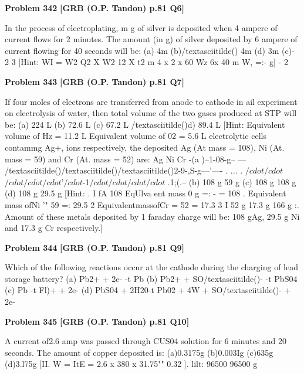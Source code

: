 \begin{problembox}
\textbf{Problem 342} \hfill \textbf{[GRB (O.P. Tandon) p.81 Q6]}
\label{q:ext-grb_all_questions-342}

In the process of electroplating, m g of silver is deposited when 
4 ampere of current flows for 2 minutes. The amount (in g) of 
silver deposited by 6 ampere of current flowing for 40 seconds 
will be: 
(a) 4m 
(b)/textasciitilde() 
4m 
(d) 3m 
(c)-
2 
3 
[Hint: 
WI = 
W2 
Q2 
X 
W2 
12 X t2 
m 
4 x 2 x 60 
Wz 
6x 40 
m 
W, =:- g] 
-
2
\end{problembox}

\begin{problembox}
\textbf{Problem 343} \hfill \textbf{[GRB (O.P. Tandon) p.81 Q7]}
\label{q:ext-grb_all_questions-343}

If four moles of electrons are transferred from anode to 
cathode in ail experiment on electrolysis of water, then total 
volume of the two gases produced at STP will be: 
(a) 224 L 
(b) 72.6 L 
(c) 67.2 L 
/textasciitilde()d) 89.4 L 
[Hint: 
Equivalent volume of Hz = 11.2 L 
Equivalent volume of 02 = 5.6 L 
electrolytic cells contammg Ag+, 
ions 
respectively, the deposited Ag (At mass = 108), Ni (At. mass 
= 59) and Cr (At. mass = 52) are: 
Ag 
Ni 
Cr 
-(a )--1-08-g-- --- /textasciitilde()/textasciitilde()/textasciitilde()2-9-,S-g---'---- . ... . $/cdot$$/cdot$$/cdot$$/cdot$$/cdot$'$/cdot$-1$/cdot$$/cdot$$/cdot$$/cdot$ .1;(.\underline{\hspace{1cm}}--
(b) 
108 g 
59 g 
(c) 
108 g 
108 g 
(d) 
108 g 
29.5 g 
[Hint: 
. I 
fA 
108 
EqUlva ent mass 0 
g =: -
= 108 
. 
Equivalent mass ofNi '" 59 =: 29.5 
2 
EquivalentmassofCr = 52 = 17.3 
3 
I 
52 g 
17.3 g 
166 g 
:. Amount of these metals deposited by 1 faraday charge will be: 
108 gAg, 29.5 g Ni and 17.3 g Cr respectively.]
\end{problembox}

\begin{problembox}
\textbf{Problem 344} \hfill \textbf{[GRB (O.P. Tandon) p.81 Q9]}
\label{q:ext-grb_all_questions-344}

Which of the following reactions occur at the cathode during 
the charging of lead storage battery? 
(a) Pb2+ + 2e- -t Pb 
(b) Pb2+ + SO/textasciitilde()- -t PbS04 
(c) Pb -t Fl)+ + 2e-
(d) PbS04 + 2H20-t Pb02 + 4W + SO/textasciitilde()- + 2e-
\end{problembox}

\begin{problembox}
\textbf{Problem 345} \hfill \textbf{[GRB (O.P. Tandon) p.81 Q10]}
\label{q:ext-grb_all_questions-345}

A current of2.6 amp was passed through CUS04 solution for 6 
minutes and 20 seconds. The amount of copper deposited is: 
(a)0.3175g 
(b)0.003Ig (c)635g 
(d)3.l75g 
[II. 
W = ItE = 2.6 x 380 x 31.75"" 0.32 ]. 
lilt: 
96500 
96500 
g
\end{problembox}

